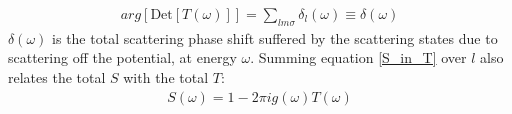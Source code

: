 \documentclass[12pt,twoside]{article}
\numberwithin{equation}{section}
\begin{document}
\begin{equation}\begin{aligned}
	\label{phase_in_T}
	arg\left[\text{Det}\left[ T(\omega) \right]\right] = \sum_{lm\sigma} \delta_l(\omega) \equiv \delta(\omega)
\end{aligned}\end{equation}
\(\delta(\omega)\) is the total scattering phase shift suffered by the scattering states due to scattering off the potential, at energy \(\omega\).
\pb Summing equation \ref{S_in_T} over \(l\) also relates the total \(S\) with the total \(T\):
\begin{equation}\begin{aligned}
	S(\omega) = 1 - 2\pi i g(\omega) T(\omega)
\end{aligned}\end{equation}
\end{document}
